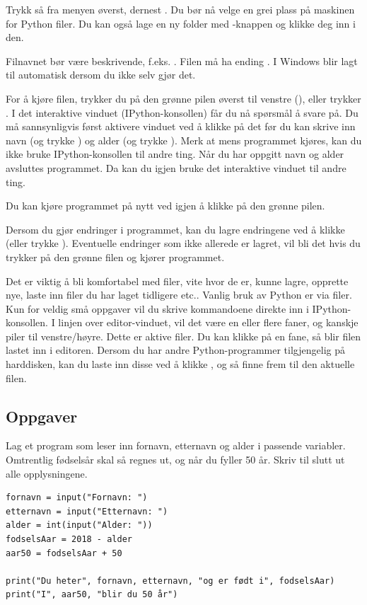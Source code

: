 Trykk så  fra menyen øverst, dernest . Du bør nå velge en grei plass på maskinen for Python filer. Du kan også lage en ny folder med -knappen og klikke deg inn i den.

Filnavnet bør være beskrivende, f.eks. . Filen må ha ending . I Windows blir  lagt til automatisk dersom du ikke selv gjør det.

For å kjøre filen, trykker du på den grønne pilen øverst til venstre (), eller trykker . I det interaktive vinduet (IPython-konsollen) får du nå spørsmål å svare på. Du må sannsynligvis først aktivere vinduet ved å klikke på det før du kan skrive inn navn (og trykke ) og alder (og trykke ). Merk at mens programmet kjøres, kan du ikke bruke IPython-konsollen til andre ting. Når du har oppgitt navn og alder avsluttes programmet. Da kan du igjen bruke det interaktive vinduet til andre ting. 

Du kan kjøre programmet på nytt ved igjen å klikke på den grønne pilen.

Dersom du gjør endringer i programmet, kan du lagre endringene ved å klikke \usnsubmenusep{} (eller trykke ). Eventuelle endringer som ikke allerede er lagret, vil bli det hvis du trykker på den grønne filen og kjører programmet.

Det er viktig å bli komfortabel med filer, vite hvor de er, kunne lagre, opprette nye, laste inn filer du har laget tidligere etc.. Vanlig bruk av Python er via filer. Kun for veldig små oppgaver vil du skrive kommandoene direkte inn i IPython-konsollen. I linjen over editor-vinduet, vil det være en eller flere faner, og kanskje piler til venstre/høyre. Dette er aktive filer. Du kan klikke på en fane, så blir filen lastet inn i editoren. Dersom du har andre Python-programmer tilgjengelig på harddisken, kan du laste inn disse ved å klikke \usnsubmenusep{}, og så finne frem til den aktuelle filen. 

\subsection{Oppgaver}

\begin{exercise}
Lag et program som leser inn fornavn, etternavn og alder i passende variabler. Omtrentlig fødselsår skal så regnes ut, og når du fyller 50 år. Skriv til slutt ut alle opplysningene.
\end{exercise}
\begin{solution}
\begin{lstlisting}
fornavn = input("Fornavn: ")
etternavn = input("Etternavn: ")
alder = int(input("Alder: "))
fodselsAar = 2018 - alder
aar50 = fodselsAar + 50

print("Du heter", fornavn, etternavn, "og er født i", fodselsAar)
print("I", aar50, "blir du 50 år")
\end{lstlisting}
\end{solution}

